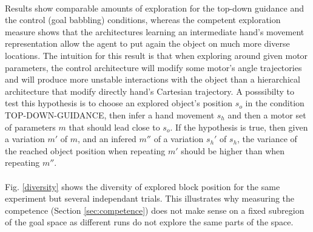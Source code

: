 \documentclass[12pt]{article}
\begin{document}
		\paragraph{}
		Results show comparable amounts of exploration for the top-down guidance and the control (goal babbling) conditions, whereas the competent exploration
		measure shows that the architectures learning an intermediate hand's movement representation allow the agent to put again the object on much more diverse
		locations. The intuition for this result is that when exploring around given motor parameters, the control architecture will modify some motor's angle trajectories and will produce more unstable interactions with the object than a hierarchical architecture that modify directly hand's Cartesian trajectory.
		A posssibilty to test this hypothesis is to choose an explored object's position $s_o$ in the condition TOP-DOWN-GUIDANCE, then infer a hand movement
		$s_h$ and then a motor set of parameters $m$ that should lead close to $s_o$. If the hypothesis is true, then given a variation $m'$ of $m$, and 
		an infered $m''$ of a variation $s_h'$ of $s_h$, the variance of the reached object position when repeating $m'$ should be higher than when 
		repeating $m''$.
		
		\paragraph{}
		Fig. \ref{diversity} shows the diversity of explored block position for the same experiment but several independant trials.
		This illustrates why measuring the competence (Section \ref{sec:competence}) does not make sense on a fixed subregion of the goal space as different runs
		do not explore the same parts of the space.
		
\end{document}
